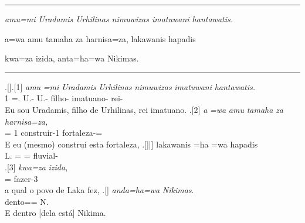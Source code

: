 \vspace{10pt}
\hrule
\vspace{10pt}


\setcounter{parcount}{0}
\begin{parnumbersa}[]

	\raggedright%
	\itshape%
	amu=mi Uradamis Urhilinas nimuwizas imatuwani hantawatis.

	a=wa amu tamaha za harnisa=za, lakawanis hapadis

	kwa=za izida, anta=ha=wa Nikimas.


\end{parnumbersa}

\vspace{10pt}
\hrule
\vspace{20pt}


\clearpage%

\ex.[]\ag.[1] \emph{amu} \emph{=mi} \emph{Uradamis} \emph{Urhilinas}
\emph{nimuwizas} \emph{imatuwani} \emph{hantawatis.}\\
\Pro{}1\Sg{} =\Refl{}. U.-\Com{}\Nom{}\Sg{} U.-\Com{}\Gen{}\Sg{} filho-\Com{}\Nom{}\Sg{}
imatuano-\Com{}\Nom{}\Sg{} rei-\Com{}\Nom{}\Sg{}\\
Eu sou Uradamis, filho de Urhilinas, rei imatuano.
\bg.[2] \emph{a} \emph{=wa} \emph{amu} \emph{tamaha} \emph{za} \emph{harnisa=za,}\\
\Conj{} =\Clt{} \Pro{}1\Sg{} construir-1\Sg{}\Pret{} \Pro{}\Neut{}\Acu{}\Sg{}
fortaleza-\Neut{}\Acu{}\Sg{}=\Clt{}\\
E eu (mesmo) construí esta fortaleza,
\bg.[||] lakawanis =ha =wa hapadis\\
L.\Com{}\Nom{}\Sg{} =\Conj{} =\Clt{} fluvial-\Com{}\Nom{}\Sg{}\\
\bg.[3] \emph{kwa=za} \emph{izida},\\
\Rel{}\Neut{}\Acu{}\Sg{}=\Clt{} fazer-3\Sg{}\Pret{}\\
a qual o povo de Laka fez,
\bg.[] \emph{anda=ha=wa} \emph{Nikimas}.\\
dento=\Conj{}=\Clt{} N.\Com{}\Nom{}\Sg{}\\
E dentro [dela está] Nikima.



